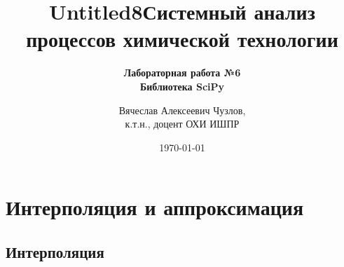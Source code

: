 \documentclass[aspectratio=169, mathserif]{beamer}%
\title{Untitled8}
\title{\LARGE{Системный анализ процессов химической технологии}}
\subtitle{\textcolor{tpugreen}{\textbf{Лабораторная работа №6}} \\ \textbf{Библиотека SciPy}}
\author[]{Вячеслав Алексеевич Чузлов, \\
к.т.н., доцент ОХИ ИШПР}
\date{\today}
\begin{document}
\newcommand{\pythoninline}[1]{%
	\colorbox{white}{%
		\parbox[b][.6em]{\widthof{\texttt{#1}}}{\texttt{#1}}%
	}%
}


\titleframe%




\section{Интерполяция и аппроксимация}
\subsection{Интерполяция}
\end{document}
